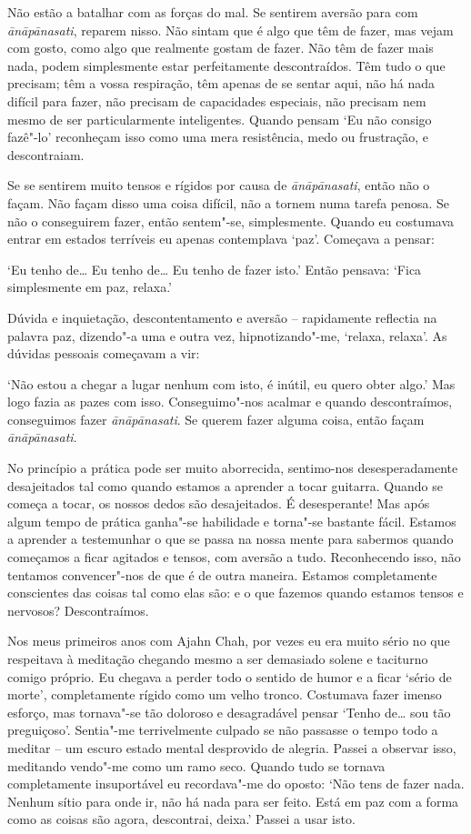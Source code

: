 Não estão a batalhar com as forças do mal. Se sentirem aversão para com
\emph{ānāpānasati}, reparem nisso. Não sintam que é algo que têm de
fazer, mas vejam com gosto, como algo que realmente gostam de fazer. Não 
têm de fazer mais nada, podem simplesmente estar perfeitamente descontraídos. 
Têm tudo o que precisam; têm a vossa respiração, têm apenas de se sentar 
aqui, não há nada difícil para fazer, não precisam de capacidades especiais,
não precisam nem mesmo de ser particularmente inteligentes. Quando pensam 
`Eu não consigo fazê"-lo' reconheçam isso como uma mera resistência, 
medo ou frustração, e descontraiam.

Se se sentirem muito tensos e rígidos por causa de \emph{ānāpānasati},
então não o façam. Não façam disso uma coisa difícil, não a tornem numa
tarefa penosa. Se não o conseguirem fazer, então sentem"-se,
simplesmente. Quando eu costumava entrar em estados terríveis eu
apenas contemplava `paz'. Começava a pensar:

`Eu tenho de\ldots{} Eu tenho de\ldots{} Eu tenho de fazer isto.' Então
pensava: `Fica simplesmente em paz, relaxa.'

Dúvida e inquietação, descontentamento e aversão -- rapidamente
reflectia na palavra paz, dizendo"-a uma e outra vez, hipnotizando"-me,
`relaxa, relaxa'. As dúvidas pessoais começavam a vir:

`Não estou a chegar a lugar nenhum com isto, é inútil, eu quero
obter algo.' Mas logo fazia as pazes com isso. Conseguimo"-nos acalmar e
quando descontraímos, conseguimos fazer \emph{ānāpānasati}. Se querem
fazer alguma coisa, então façam \emph{ānāpānasati}.

No princípio a prática pode ser muito aborrecida, sentimo-nos
desesperadamente desajeitados tal como quando estamos a aprender a tocar
guitarra. Quando se começa a tocar, os nossos dedos são desajeitados. É
desesperante! Mas após algum tempo de prática ganha"-se habilidade e
torna"-se bastante fácil. Estamos a aprender a testemunhar o que se passa
na nossa mente para sabermos quando começamos a ficar agitados e tensos,
com aversão a tudo. Reconhecendo isso, não tentamos convencer"-nos de que
é de outra maneira. Estamos completamente conscientes das coisas tal
como elas são: e o que fazemos quando estamos tensos e nervosos?
Descontraímos.

Nos meus primeiros anos com Ajahn Chah, por vezes eu era muito sério no
que respeitava à meditação chegando mesmo a ser demasiado solene e
taciturno comigo próprio. Eu chegava a perder todo o sentido de humor e
a ficar `sério de morte', completamente rígido como um velho tronco.
Costumava fazer imenso esforço, mas tornava"-se tão doloroso e
desagradável pensar `Tenho de\ldots{} sou tão preguiçoso'. Sentia"-me 
terrivelmente culpado se não passasse o tempo todo a meditar -- um
escuro estado mental desprovido de alegria. Passei a observar isso,
meditando vendo"-me como um ramo seco. Quando tudo se tornava
completamente insuportável eu recordava"-me do oposto: `Não tens de fazer
nada. Nenhum sítio para onde ir, não há nada para ser feito. Está em paz
com a forma como as coisas são agora, descontrai, deixa.' Passei a usar
isto.

